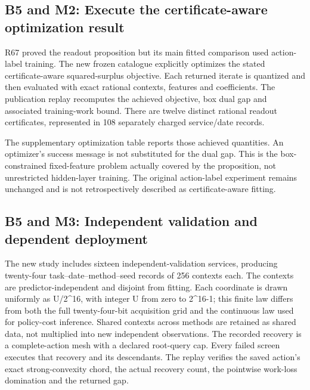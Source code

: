 \hypertarget{b5-and-m2-execute-the-certificate-aware-optimization-result}{%
\subsection{B5 and M2: Execute the certificate-aware optimization
result}\label{b5-and-m2-execute-the-certificate-aware-optimization-result}}

R67 proved the readout proposition but its main fitted comparison used
action-label training. The new frozen catalogue explicitly optimizes the
stated certificate-aware squared-surplus objective. Each returned
iterate is quantized and then evaluated with exact rational contexts,
features and coefficients. The publication replay recomputes the
achieved objective, box dual gap and associated training-work bound.
There are twelve distinct rational readout certificates, represented in
108 separately charged service/date records.

The supplementary optimization table reports those achieved quantities.
An optimizer's success message is not substituted for the dual gap. This
is the box-constrained fixed-feature problem actually covered by the
proposition, not unrestricted hidden-layer training. The original
action-label experiment remains unchanged and is not retrospectively
described as certificate-aware fitting.

\hypertarget{b5-and-m3-independent-validation-and-dependent-deployment}{%
\subsection{B5 and M3: Independent validation and dependent
deployment}\label{b5-and-m3-independent-validation-and-dependent-deployment}}

The new study includes sixteen independent-validation services,
producing twenty-four task--date--method--seed records of 256 contexts
each. The contexts are predictor-independent and disjoint from fitting.
Each coordinate is drawn uniformly as U/2\^{}16, with integer U from
zero to 2\^{}16-1; this finite law differs from both the full
twenty-four-bit acquisition grid and the continuous law used for
policy-cost inference. Shared contexts across methods are retained as
shared data, not multiplied into new independent observations. The
recorded recovery is a complete-action mesh with a declared root-query
cap. Every failed screen executes that recovery and its descendants. The
replay verifies the saved action's exact strong-convexity chord, the
actual recovery count, the pointwise work-loss domination and the
returned gap.

